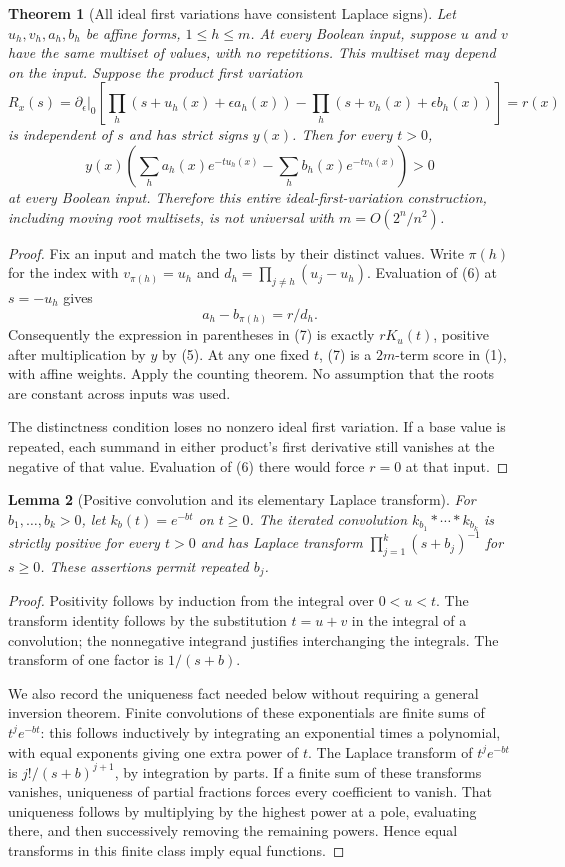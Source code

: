 \documentclass[11pt]{article}
\newtheorem{theorem}{Theorem}
\newtheorem{lemma}[theorem]{Lemma}
\begin{document}
\begin{theorem}[All ideal first variations have consistent Laplace signs]
Let $u_h,v_h,a_h,b_h$ be affine forms, $1\le h\le m$.
At every Boolean input, suppose $u$ and $v$ have the same multiset
of values, with no repetitions. This multiset may depend on the input.
Suppose the product first variation
\[
 R_x(s)=\left.\partial_\epsilon\right|_0
 \left[\prod_h(s+u_h(x)+\epsilon a_h(x))-
       \prod_h(s+v_h(x)+\epsilon b_h(x))\right]=r(x)
\tag{6}
\]
is independent of $s$ and has strict signs $y(x)$.
Then for every $t>0$,
\[
 y(x)\left(\sum_h a_h(x)e^{-tu_h(x)}
             -\sum_h b_h(x)e^{-tv_h(x)}\right)>0
\tag{7}
\]
at every Boolean input. Therefore this entire ideal-first-variation
construction, including moving root multisets, is not universal with
$m=O(2^n/n^2)$.
\end{theorem}
\begin{proof}
Fix an input and match the two lists by their distinct values.
Write $\pi(h)$ for the index with $v_{\pi(h)}=u_h$ and
$d_h=\prod_{j\ne h}(u_j-u_h)$. Evaluation of (6) at $s=-u_h$
gives
\[
 a_h-b_{\pi(h)}=r/d_h.
\]
Consequently the expression in parentheses in (7) is exactly
$rK_u(t)$, positive after multiplication by $y$ by (5).
At any one fixed $t$, (7) is a $2m$-term score in (1), with
affine weights. Apply the counting theorem. No assumption that
the roots are constant across inputs was used.

The distinctness condition loses no nonzero ideal first variation.
If a base value is repeated, each summand in either product's first
derivative still vanishes at the negative of that value. Evaluation
of (6) there would force $r=0$ at that input.
\end{proof}

\begin{lemma}[Positive convolution and its elementary Laplace transform]
For $b_1,\ldots,b_k>0$, let $k_b(t)=e^{-bt}$ on $t\ge0$.
The iterated convolution $k_{b_1}*\cdots*k_{b_k}$ is strictly
positive for every $t>0$ and has Laplace transform
$\prod_{j=1}^k(s+b_j)^{-1}$ for $s\ge0$.
These assertions permit repeated $b_j$.
\end{lemma}
\begin{proof}
Positivity follows by induction from the integral over $0<u<t$.
The transform identity follows by the substitution $t=u+v$ in the
integral of a convolution; the nonnegative integrand justifies
interchanging the integrals. The transform of one factor is
$1/(s+b)$.

We also record the uniqueness fact needed below without requiring a
general inversion theorem. Finite convolutions of these exponentials
are finite sums of $t^j e^{-bt}$: this follows inductively by
integrating an exponential times a polynomial, with equal exponents
giving one extra power of $t$. The Laplace transform of
$t^j e^{-bt}$ is $j!/(s+b)^{j+1}$, by integration by parts.
If a finite sum of these transforms vanishes, uniqueness of partial
fractions forces every coefficient to vanish. That uniqueness follows
by multiplying by the highest power at a pole, evaluating there,
and then successively removing the remaining powers. Hence equal
transforms in this finite class imply equal functions.
\end{proof}
\end{document}
